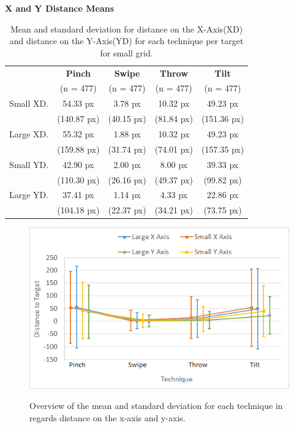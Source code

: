 \begin{table}[H]
	\centering
	\textbf{X and Y Distance Means}\\[4pt]
	\begin{adjustbox}{width=\columnwidth}
	\begin{tabular}{|c|c|c|c|c|}
		\hline
		\rowcolor[HTML]{9B9B9B} 
		& \textbf{Pinch} & \textbf{Swipe} & \textbf{Throw} & \textbf{Tilt} \\
		\rowcolor[HTML]{9B9B9B} 
		& (n = 477) & (n = 477) & (n = 477) & (n = 477) \\ \hline
		Small XD. & 54.33 px & 3.78 px & 10.32 px & 49.23 px \\
		& (140.87 px) & (40.15 px) & (81.84 px) & (151.36 px) \\ \hline
		Large XD. & 55.32 px & 1.88 px & 10.32 px & 49.23 px \\
		& (159.88 px) & (31.74 px) & (74.01 px) & (157.35 px) \\ \hline
		Small YD. & 42.90 px & 2.00 px & 8.00 px & 39.33 px \\
		& (110.30 px) & (26.16 px) & (49.37 px) & (99.82 px) \\ \hline
		Large YD. & 37.41 px & 1.14 px & 4.33 px & 22.86 px \\
		& (104.18 px) & (22.37 px) & (34.21 px) & (73.75 px) \\ \hline
	\end{tabular}
	\end{adjustbox}
	\caption{Mean and standard deviation for distance on the X-Axis(XD) and distance on the Y-Axis(YD) for each technique per target for small grid.}
	\label{tab:distanceXY}
\end{table}

\begin{figure}[H]
	{\includegraphics[width = 1\columnwidth ]{images/distance_axis.png}} 
	\caption{
		Overview of the mean and standard deviation for each technique in regards distance on the x-axis and y-axis.
	}
	\label{fig:distanceXYResults}
\end{figure}

